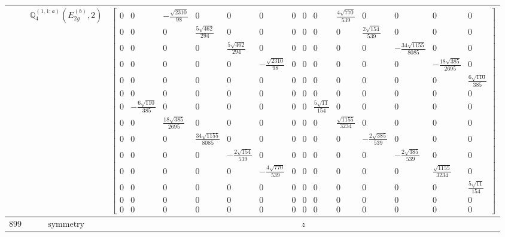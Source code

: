 \documentclass[fleqn,8pt,landscape]{jsarticle}
\begin{document}
\begin{longtable}{ccc}
$  $ & $ \mathbb{Q}_{4}^{(1,1;a)}(E_{2g}^{(b)},2) $ & $ \begin{bmatrix} 0 & 0 & - \frac{\sqrt{2310}}{98} & 0 & 0 & 0 & 0 & 0 & 0 & \frac{4 \sqrt{770}}{539} & 0 & 0 & 0 & 0 \\ 0 & 0 & 0 & \frac{5 \sqrt{462}}{294} & 0 & 0 & 0 & 0 & 0 & 0 & \frac{2 \sqrt{154}}{539} & 0 & 0 & 0 \\ 0 & 0 & 0 & 0 & \frac{5 \sqrt{462}}{294} & 0 & 0 & 0 & 0 & 0 & 0 & - \frac{34 \sqrt{1155}}{8085} & 0 & 0 \\ 0 & 0 & 0 & 0 & 0 & - \frac{\sqrt{2310}}{98} & 0 & 0 & 0 & 0 & 0 & 0 & - \frac{18 \sqrt{385}}{2695} & 0 \\ 0 & 0 & 0 & 0 & 0 & 0 & 0 & 0 & 0 & 0 & 0 & 0 & 0 & \frac{6 \sqrt{110}}{385} \\ 0 & 0 & 0 & 0 & 0 & 0 & 0 & 0 & 0 & 0 & 0 & 0 & 0 & 0 \\ 0 & - \frac{6 \sqrt{110}}{385} & 0 & 0 & 0 & 0 & 0 & 0 & \frac{5 \sqrt{11}}{154} & 0 & 0 & 0 & 0 & 0 \\ 0 & 0 & \frac{18 \sqrt{385}}{2695} & 0 & 0 & 0 & 0 & 0 & 0 & \frac{\sqrt{1155}}{3234} & 0 & 0 & 0 & 0 \\ 0 & 0 & 0 & \frac{34 \sqrt{1155}}{8085} & 0 & 0 & 0 & 0 & 0 & 0 & - \frac{2 \sqrt{385}}{539} & 0 & 0 & 0 \\ 0 & 0 & 0 & 0 & - \frac{2 \sqrt{154}}{539} & 0 & 0 & 0 & 0 & 0 & 0 & - \frac{2 \sqrt{385}}{539} & 0 & 0 \\ 0 & 0 & 0 & 0 & 0 & - \frac{4 \sqrt{770}}{539} & 0 & 0 & 0 & 0 & 0 & 0 & \frac{\sqrt{1155}}{3234} & 0 \\ 0 & 0 & 0 & 0 & 0 & 0 & 0 & 0 & 0 & 0 & 0 & 0 & 0 & \frac{5 \sqrt{11}}{154} \\ 0 & 0 & 0 & 0 & 0 & 0 & 0 & 0 & 0 & 0 & 0 & 0 & 0 & 0 \\ 0 & 0 & 0 & 0 & 0 & 0 & 0 & 0 & 0 & 0 & 0 & 0 & 0 & 0 \end{bmatrix} $ \\ \hline
$ 899 $ & $ \text{symmetry} $ & $ z $ \\

\end{longtable}
\end{document}
